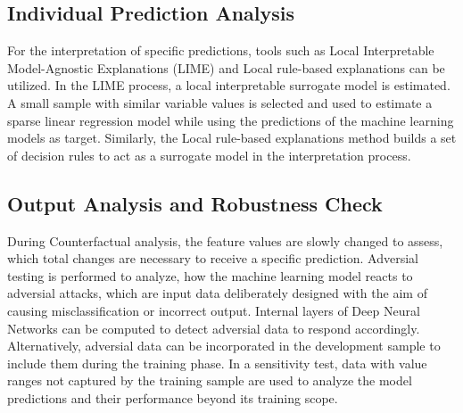 \subsection{Individual Prediction Analysis}
For the interpretation of specific predictions, tools such as Local Interpretable Model-Agnostic Explanations (LIME) and Local rule-based explanations can be utilized. In the LIME process, a local interpretable surrogate model is estimated. A small sample with similar variable values is selected and used to estimate a sparse linear regression model while using the predictions of the machine learning models as target. Similarly, the Local rule-based explanations method builds a set of decision rules to act as a surrogate model in the interpretation process. \cite[p.~65-67]{Roberts2022}

\subsection{Output Analysis and Robustness Check}
During Counterfactual analysis, the feature values are slowly changed to assess, which total changes are necessary to receive a specific prediction. Adversial testing is performed to analyze, how the machine learning model reacts to adversial attacks, which are input data deliberately designed with the aim of causing misclassification or incorrect output. Internal layers of Deep Neural Networks can be computed to detect adversial data to respond accordingly. Alternatively, adversial data can be incorporated in the development sample to include them during the training phase. In a sensitivity test, data with value ranges not captured by the training sample are used to analyze the model predictions and their performance beyond its training scope. \cite[p.~65-67]{Roberts2022}
